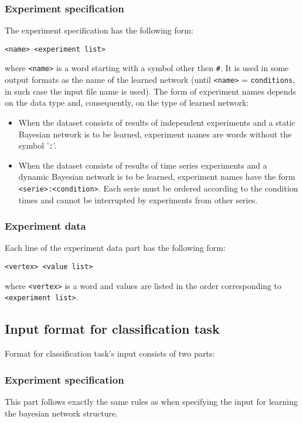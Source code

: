 \subsubsection{Experiment specification}

 The experiment specification has the following form:
\begin{verbatim}
<name> <experiment list>
\end{verbatim}
 where \texttt{<name>} is a word starting with a symbol other then \texttt{\#}.
 It is used in some output formats as the name of the learned network 
(until \texttt{<name>} = \texttt{conditions}, 
in such case the input file name is used).
 The form of experiment names depends on the data type and, consequently, on the type of learned network:
 \begin{itemize}
 \item When the dataset consists of results of independent experiments and a static Bayesian network is to be learned, experiment names are words without the symbol '\texttt{:}'.
 \item When the dataset consists of results of time series experiments and a dynamic Bayesian network is to be learned, experiment names have the form \texttt{<serie>:<condition>}.
  Each serie must be ordered according to the condition times and cannot be interrupted by experiments from other series.
 \end{itemize}
 
\subsubsection{Experiment data}

 Each line of the experiment data part has the following form:
\begin{verbatim}
<vertex> <value list>
\end{verbatim}
 where \texttt{<vertex>} is a word and values are listed in the order corresponding to \texttt{<experiment list>}.
 
\subsection{Input format for classification task}

 Format for classification task's input consists of two parts:

\subsubsection{Experiment specification}
 This part follows exactly the same rules as when specifying the input for learning the bayesian network structure.

